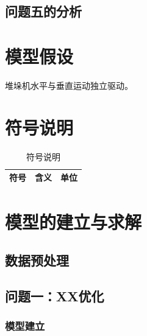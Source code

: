 \documentclass[a4paper]{cumcmthesis}
\begin{document}
\subsection{问题五的分析}

\section{模型假设}
\begin{assumption}
堆垛机水平与垂直运动独立驱动。
\end{assumption}

\section{符号说明}
\begin{table}[H]
\centering
\caption{符号说明}
\label{tab:symbols}
\begin{tabular}{cll}
\toprule
符号 & 含义 & 单位 \\
\midrule
\end{tabular}
\end{table}

\section{模型的建立与求解}

\subsection{数据预处理}

\subsection{问题一：XX优化}

\FloatBarrier\subsubsection{模型建立}
\end{document}
